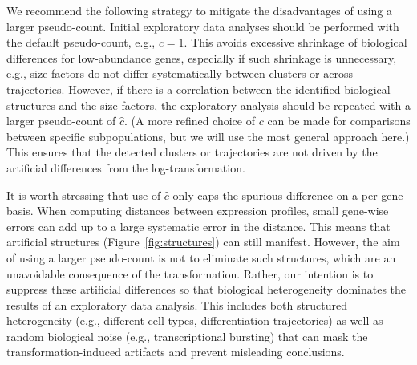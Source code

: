 \documentclass[10pt,letterpaper]{article}
\begin{document}


We recommend the following strategy to mitigate the disadvantages of using a larger pseudo-count.
Initial exploratory data analyses should be performed with the default pseudo-count, e.g., $c=1$.
This avoids excessive shrinkage of biological differences for low-abundance genes, especially if such shrinkage is unnecessary, 
e.g., size factors do not differ systematically between clusters or across trajectories.
However, if there is a correlation between the identified biological structures and the size factors, the exploratory analysis should be repeated with a larger pseudo-count of $\hat c$. 
(A more refined choice of $c$ can be made for comparisons between specific subpopulations, but we will use the most general approach here.)
This ensures that the detected clusters or trajectories are not driven by the artificial differences from the log-transformation.

It is worth stressing that use of $\hat c$ only caps the spurious difference on a per-gene basis.
When computing distances between expression profiles, small gene-wise errors can add up to a large systematic error in the distance.
This means that artificial structures (Figure~\ref{fig:structures}) can still manifest.
However, the aim of using a larger pseudo-count is not to eliminate such structures, which are an unavoidable consequence of the transformation.
Rather, our intention is to suppress these artificial differences so that biological heterogeneity dominates the results of an exploratory data analysis.
This includes both structured heterogeneity (e.g., different cell types, differentiation trajectories) as well as random biological noise (e.g., transcriptional bursting) that can mask the transformation-induced artifacts and prevent misleading conclusions.
\end{document}
